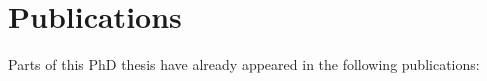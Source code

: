 \chapter*{Publications}
Parts of this PhD thesis have already appeared in the following publications:

\begin{refsection}
    \small
    \nocite{guse_macro-temporal_2013}
    \nocite{guse_modelling_2014}
    \nocite{weiss_temporal_2014}
    \printbibliography[heading=none]
\end{refsection}